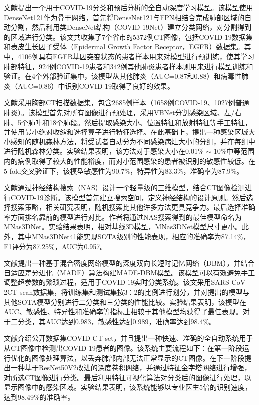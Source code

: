 \documentclass[journal,twoside,web]{ieeecolor}
\begin{document}
文献\cite{b34}提出一个用于COVID-19分类和预后分析的全自动深度学习模型。该模型使用DenseNet121\cite{b35}作为骨干网络，首先将DenseNet121与FPN相结合完成肺部区域的自动分割，然后利用类DenseNet结构（COVID-19Net）建立分类网络，对分割得到的区域进行分类。该文共收集了7个省市的5372例CT图像，包括COVID-19数据集和表皮生长因子受体（Epidermal Growth Factor Receptor，EGFR）数据集。其中，4106例具有EGFR基因突变状态的患者样本用来对模型进行预训练\cite{b36}，使其学习肺部特征，924例COVID-19患者和342例其他肺炎患者样本则用来进行模型训练和验证。在4个外部验证集中，该模型从其他肺炎（AUC=0.87和0.88）和病毒性肺炎（AUC=0.86）中识别COVID-19取得了良好的效果。

文献\cite{b37}采用胸部CT扫描数据集，包含2685例样本（1658例COVID-19、1027例普通肺炎）。该模型首先对所有图像进行预处理，采用VBNet\cite{b38}分割感染区域、左/右肺、5个肺叶和18个肺段。然后提取感染大小、位置特征和放射特征等手工特征，并使用最小绝对收缩和选择算子\cite{b39}进行特征选择。在此基础上，提出一种感染区域大小感知的随机森林方法，将受试者自动分为不同感染病灶大小的分组，并在每组中进行随机森林分类。实验结果表明，该方法对于感染大小在0.01\% $ \sim $ 10\%中等范围内的病例取得了较大的性能裕度，而对小范围感染的患者被识别的敏感性较低。在5-fold交叉验证下，该模型敏感性为90.7\%，特异性为83.3\%，准确率为87.9\%。

文献\cite{b40}通过神经结构搜索（NAS）设计一个轻量级的三维模型，结合CT图像检测进行COVID-19诊断。该模型首先建立搜索空间，定义神经结构的设计原则。然后选择搜索策略，相关研究表明，随机搜索比其他许多方法更具竞争力\cite{b41}。最后选择准确率方面排名靠前的模型进行对比。作者将通过NAS搜索得到的最佳模型命名为MNas3DNet。实验结果表明，相对基线3D模型，MNas3DNet模型尺寸更小。此外，其中MNas3DNet41能实现SOTA级别的性能表现，相应的准确率为87.14\%，F1评分为87.25\%，AUC为0.957。

文献\cite{b42}提出一种基于混合密度网络模型的深度双向长短时记忆网络（DBM），并结合自适应差分进化（MADE）算法\cite{b43}构建MADE-DBM模型。该模型可以有效避免手工调整超参数的繁琐过程，适用于COVID-19实时分类系统。该文采用SARS-CoV-2CT-scan数据集，将训练集和测试集按3∶2的比例进行划分，并对提出的模型与其他SOTA模型分别进行二分类和三分类的性能比较。实验结果表明，该模型在AUC、敏感性、特异性和准确率等指标上相较于其他模型均获得了最佳表现。对于二分类，其AUC达到0.983，敏感性达到0.989，准确率达到98.4\%。

文献\cite{b44}介绍公开数据集COVID-CT-set，并且提出一种快速、准确的全自动系统用于从CT图像中检测出COVID-19患者的图像。该系统主要流程如下：在第一阶段运行优化的图像处理算法，以丢弃肺部内部无法正常显示的CT图像。在下一阶段提出一种基于ResNet50V2改进的深度卷积网络，并通过特征金字塔网络进行增强，对所选CT图像进行分类。最后利用特征可视化算法对分类后的图像进行处理，以显示图像中的感染区域。实验结果表明，该系统能够以专业医生5倍的识别速度，达到98.49\%的准确率。
\end{document}
